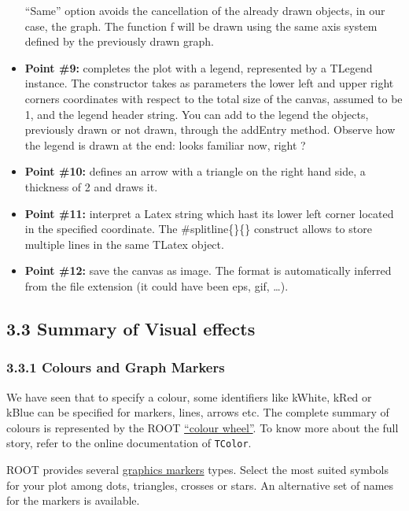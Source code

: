 \documentclass{article}
\begin{document}
\begin{itemize}
  ``Same'' option avoids the cancellation of the already drawn objects,
  in our case, the graph. The function f will be drawn using the same
  axis system defined by the previously drawn graph.
\item
  \textbf{Point \#9:} completes the plot with a legend, represented by a
  TLegend instance. The constructor takes as parameters the lower left
  and upper right corners coordinates with respect to the total size of
  the canvas, assumed to be 1, and the legend header string. You can add
  to the legend the objects, previously drawn or not drawn, through the
  addEntry method. Observe how the legend is drawn at the end: looks
  familiar now, right ?
\item
  \textbf{Point \#10:} defines an arrow with a triangle on the right
  hand side, a thickness of 2 and draws it.
\item
  \textbf{Point \#11:} interpret a Latex string which hast its lower
  left corner located in the specified coordinate. The
  \#splitline\{\}\{\} construct allows to store multiple lines in the
  same TLatex object.
\item
  \textbf{Point \#12:} save the canvas as image. The format is
  automatically inferred from the file extension (it could have been
  eps, gif, \ldots{}).
\end{itemize}

\subsection{3.3 Summary of Visual
effects}\label{summary-of-visual-effects}

\subsubsection{3.3.1 Colours and Graph
Markers}\label{colours-and-graph-markers}

We have seen that to specify a colour, some identifiers like kWhite,
kRed or kBlue can be specified for markers, lines, arrows etc. The
complete summary of colours is represented by the ROOT
\href{http://root.cern.ch/root/htmldoc/TColor.html\#C02}{``colour
wheel''}. To know more about the full story, refer to the online
documentation of \texttt{TColor}.

ROOT provides several
\href{http://root.cern.ch/root/htmldoc/TAttMarker.html\#M2}{graphics
markers} types. Select the most suited symbols for your plot among dots,
triangles, crosses or stars. An alternative set of names for the markers
is available.
\end{document}
